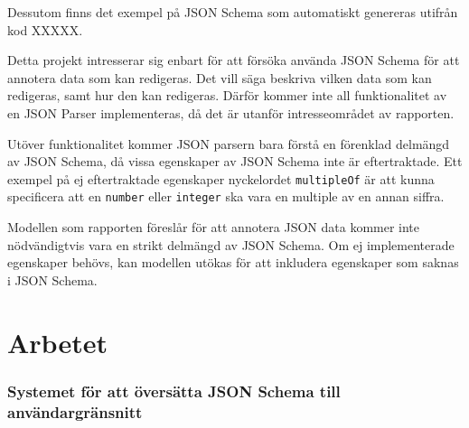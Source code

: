 \documentclass[swedish]{kththesis}
\begin{document}
Dessutom finns det exempel på JSON Schema som automatiskt genereras utifrån kod XXXXX.

Detta projekt intresserar sig enbart för att försöka använda JSON Schema för att annotera data som kan redigeras. Det vill säga beskriva vilken data som kan redigeras, samt hur den kan redigeras. Därför kommer inte all funktionalitet av en JSON Parser implementeras, då det är utanför intresseområdet av rapporten.

Utöver funktionalitet kommer JSON parsern bara förstå en förenklad delmängd av JSON Schema, då vissa egenskaper av JSON Schema inte är eftertraktade. Ett exempel på ej eftertraktade egenskaper nyckelordet \texttt{multipleOf} är att kunna specificera att en \texttt{number} eller \texttt{integer} ska vara en multiple av en annan siffra.

Modellen som rapporten föreslår för att annotera JSON data kommer inte nödvändigtvis vara en strikt delmängd av JSON Schema. Om ej implementerade egenskaper behövs, kan modellen utökas för att inkludera egenskaper som saknas i JSON Schema.

\chapter{Arbetet}

\subsection{Systemet för att översätta JSON Schema till användargränsnitt}
\begin{figure}
\end{figure}
\end{document}
